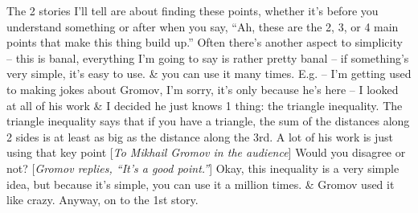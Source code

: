 \documentclass[oneside]{book}
\numberwithin{equation}{section}
\begin{document}
The 2 stories I'll tell are about finding these points, whether it's before you understand something or after when you say, ``Ah, these are the 2, 3, or 4 main points that make this thing build up.'' Often there's another aspect to simplicity -- this is banal, everything I'm going to say is rather pretty banal -- if something's very simple, it's easy to use. \& you can use it many times. E.g. -- I'm getting used to making jokes about Gromov, I'm sorry, it's only because he's here -- I looked at all of his work \& I decided he just knows 1 thing: the triangle inequality. The triangle inequality says that if you have a triangle, the sum of the distances along 2 sides is at least as big as the distance along the 3rd. A lot of his work is just using that key point [\textit{To Mikhail Gromov in the audience}] Would you disagree or not? [\textit{Gromov replies, ``It's a good point.''}] Okay, this inequality is a very simple idea, but because it's simple, you can use it a million times. \& Gromov used it like crazy. Anyway, on to the 1st story.
\end{document}
